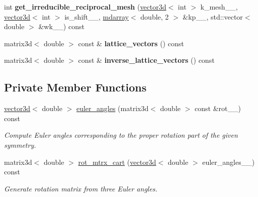 \begin{DoxyCompactItemize}
\item 
\hypertarget{classsirius_1_1_symmetry_a8f8ad86b74af0682f37f9cb5a27ad49a}{}int {\bfseries get\+\_\+irreducible\+\_\+reciprocal\+\_\+mesh} (\hyperlink{classgeometry3d_1_1vector3d}{vector3d}$<$ int $>$ k\+\_\+mesh\+\_\+\+\_\+, \hyperlink{classgeometry3d_1_1vector3d}{vector3d}$<$ int $>$ is\+\_\+shift\+\_\+\+\_\+, \hyperlink{classsddk_1_1mdarray}{mdarray}$<$ double, 2 $>$ \&kp\+\_\+\+\_\+, std\+::vector$<$ double $>$ \&wk\+\_\+\+\_\+) const \label{classsirius_1_1_symmetry_a8f8ad86b74af0682f37f9cb5a27ad49a}

\item 
\hypertarget{classsirius_1_1_symmetry_a2dfb53b222887125dc33fb3f6c7f5561}{}matrix3d$<$ double $>$ const \& {\bfseries lattice\+\_\+vectors} () const \label{classsirius_1_1_symmetry_a2dfb53b222887125dc33fb3f6c7f5561}

\item 
\hypertarget{classsirius_1_1_symmetry_a05278d445d16cb18697202ff6a1b19b6}{}matrix3d$<$ double $>$ const \& {\bfseries inverse\+\_\+lattice\+\_\+vectors} () const \label{classsirius_1_1_symmetry_a05278d445d16cb18697202ff6a1b19b6}

\end{DoxyCompactItemize}
\subsection*{Private Member Functions}
\begin{DoxyCompactItemize}
\item 
\hyperlink{classgeometry3d_1_1vector3d}{vector3d}$<$ double $>$ \hyperlink{classsirius_1_1_symmetry_a9a087124f9d33c1b1a12388f8e03d8bb}{euler\+\_\+angles} (matrix3d$<$ double $>$ const \&rot\+\_\+\+\_\+) const 
\begin{DoxyCompactList}\small\item\em Compute Euler angles corresponding to the proper rotation part of the given symmetry. \end{DoxyCompactList}\item 
matrix3d$<$ double $>$ \hyperlink{classsirius_1_1_symmetry_a93c0431ccab0e9bb332706421e8ad50f}{rot\+\_\+mtrx\+\_\+cart} (\hyperlink{classgeometry3d_1_1vector3d}{vector3d}$<$ double $>$ euler\+\_\+angles\+\_\+\+\_\+) const 
\begin{DoxyCompactList}\small\item\em Generate rotation matrix from three Euler angles. \end{DoxyCompactList}\end{DoxyCompactItemize}
